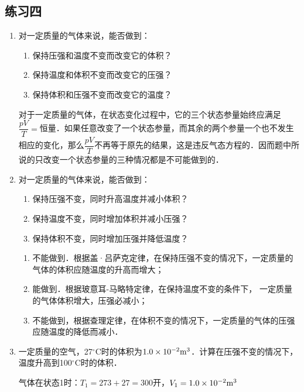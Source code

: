 \subsection{练习四}

\begin{enumerate}
	\item 对一定质量的气体来说，能否做到：
	\begin{enumerate}
	\item	保持压强和温度不变而改变它的体积？
	\item	保持温度和体积不变而改变它的压强？
	\item	保持体积和压强不变而改变它的温度？	 
	\end{enumerate}

\begin{solution}
对于一定质量的气体，在状态变化过程中，它的三个状态参量始终应满足$\dfrac{pV}{T}=$恒量．如果任意改变了一个状态参量，而其余的两个参量一个也不发生相应的变化，那么$\dfrac{pV}{T}$不再等于原先的结果，这是违反气态方程的．因而题中所说的只改变一个状态参量的三种情况都是不可能做到的．
\end{solution}
\item  对一定质量的气体来说，能否做到：
\begin{enumerate}
\item 保持压强不变，同时升高温度并减小体积？
\item 保持温度不变，同时增加体积并减小压强？
\item 保持体积不变，同时增加压强并降低温度？
\end{enumerate}

\begin{solution}
\begin{enumerate}
    \item 不能做到．根据盖·吕萨克定律，在保持压强不变的情况下，一定质量的气体的体积应随温度的升高而增大；
    \item 能做到．根据玻意耳-马略特定律，在保持温度不变的条件下，
    一定质量的气体体积增大，压强必减小；
    \item 不能做到，根据查理定律，在体积不变的情况下，一定质量的气体的压强应随温度的降低而减小．
\end{enumerate}
\end{solution}
\item  一定质量的空气，27$^\circ$C时的体积为$1.0\times 10^{-2}{\rm m}^3$．计算在压强不变的情况下，温度升高到100$^\circ$C时的体积．

\begin{solution}
气体在状态1时：$T_1=273+27=300$开，$V_1=1.0\times10^{-2}{\rm m^3}$


\end{solution}
\end{enumerate}
